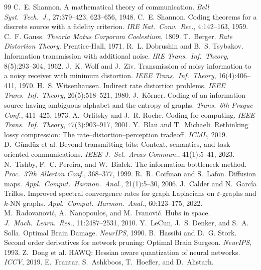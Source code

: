 \documentclass[lettersize,onecolumn]{IEEEtran}
\theoremstyle{definition}
\theoremstyle{remark}
\begin{document}
\begin{thebibliography}{99}
 C.~E. Shannon. A mathematical theory of communication.
\emph{Bell Syst.\ Tech.\ J.}, 27:379--423, 623--656, 1948.
 C.~E. Shannon. Coding theorems for a discrete source with a
fidelity criterion. \emph{IRE Nat.\ Conv.\ Rec.}, 4:142--163, 1959.
 C.~F. Gauss. \emph{Theoria Motus Corporum Coelestium}, 1809.
 T.~Berger. \emph{Rate Distortion Theory}. Prentice-Hall, 1971.
 R.~L. Dobrushin and B.~S. Tsybakov. Information transmission
with additional noise. \emph{IRE Trans.\ Inf.\ Theory}, 8(5):293--304, 1962.
 J.~K. Wolf and J.~Ziv. Transmission of noisy information to a
noisy receiver with minimum distortion. \emph{IEEE Trans.\ Inf.\ Theory},
16(4):406--411, 1970.
 H.~S. Witsenhausen. Indirect rate distortion problems.
\emph{IEEE Trans.\ Inf.\ Theory}, 26(5):518--521, 1980.
 J.~K\"orner. Coding of an information source having ambiguous
alphabet and the entropy of graphs. \emph{Trans.\ 6th Prague Conf.}, 411--425, 1973.
 A.~Orlitsky and J.~R. Roche. Coding for computing.
\emph{IEEE Trans.\ Inf.\ Theory}, 47(3):903--917, 2001.
 Y.~Blau and T.~Michaeli. Rethinking lossy compression: The
rate--distortion--perception tradeoff. \emph{ICML}, 2019.
 D.~G\"und\"uz et al. Beyond transmitting bits: Context,
semantics, and task-oriented communications. \emph{IEEE J.\ Sel.\ Areas Commun.},
41(1):5--41, 2023.
 N.~Tishby, F.~C. Pereira, and W.~Bialek. The information
bottleneck method. \emph{Proc.\ 37th Allerton Conf.}, 368--377, 1999.
 R.~R. Coifman and S.~Lafon. Diffusion maps. \emph{Appl.\
Comput.\ Harmon.\ Anal.}, 21(1):5--30, 2006.
 J.~Calder and N.~Garc\'ia Trillos. Improved spectral
convergence rates for graph Laplacians on $\varepsilon$-graphs and $k$-NN graphs.
\emph{Appl.\ Comput.\ Harmon.\ Anal.}, 60:123--175, 2022.
 M.~Radovanovi\'c, A.~Nanopoulos, and M.~Ivanovi\'c. Hubs in
space. \emph{J.\ Mach.\ Learn.\ Res.}, 11:2487--2531, 2010.
 Y.~LeCun, J.~S. Denker, and S.~A. Solla. Optimal Brain Damage.
\emph{NeurIPS}, 1990.
 B.~Hassibi and D.~G. Stork. Second order derivatives for
network pruning: Optimal Brain Surgeon. \emph{NeurIPS}, 1993.
 Z.~Dong et al. HAWQ: Hessian aware quantization of neural
networks. \emph{ICCV}, 2019.
 E.~Frantar, S.~Ashkboos, T.~Hoefler, and D.~Alistarh.

\end{thebibliography}
\end{document}
